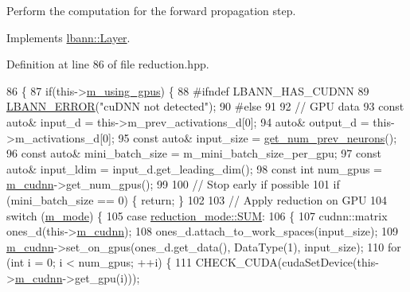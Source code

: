 Perform the computation for the forward propagation step. 

Implements \hyperlink{classlbann_1_1Layer_a523319dd1bd87a0612afa1912bb5aad7}{lbann\+::\+Layer}.



Definition at line 86 of file reduction.\+hpp.


\begin{DoxyCode}
86                              \{
87     \textcolor{keywordflow}{if}(this->\hyperlink{classlbann_1_1Layer_af7881cb5eff5207c15fa835d65462e8f}{m\_using\_gpus}) \{
88 \textcolor{preprocessor}{    #ifndef LBANN\_HAS\_CUDNN}
89       \hyperlink{base_8hpp_a80b1d707117e968a6951b7222e4b2b87}{LBANN\_ERROR}(\textcolor{stringliteral}{"cuDNN not detected"});
90 \textcolor{preprocessor}{    #else}
91       
92       \textcolor{comment}{// GPU data}
93       \textcolor{keyword}{const} \textcolor{keyword}{auto}& input\_d = this->m\_prev\_activations\_d[0];
94       \textcolor{keyword}{auto}& output\_d = this->m\_activations\_d[0];
95       \textcolor{keyword}{const} \textcolor{keyword}{auto}& input\_size = \hyperlink{classlbann_1_1Layer_a27112eb70bbfbd7f3c3e749960400dec}{get\_num\_prev\_neurons}();
96       \textcolor{keyword}{const} \textcolor{keyword}{auto}& mini\_batch\_size = m\_mini\_batch\_size\_per\_gpu;
97       \textcolor{keyword}{const} \textcolor{keyword}{auto}& input\_ldim = input\_d.get\_leading\_dim();
98       \textcolor{keyword}{const} \textcolor{keywordtype}{int} num\_gpus = \hyperlink{classlbann_1_1Layer_a08dbb94239e3b8c96329786c57c72e21}{m\_cudnn}->get\_num\_gpus();
99 
100       \textcolor{comment}{// Stop early if possible}
101       \textcolor{keywordflow}{if} (mini\_batch\_size == 0) \{ \textcolor{keywordflow}{return}; \}
102 
103       \textcolor{comment}{// Apply reduction on GPU}
104       \textcolor{keywordflow}{switch} (\hyperlink{classlbann_1_1reduction__layer_aa8c753154fec05a00ede9217df3ba638}{m\_mode}) \{
105       \textcolor{keywordflow}{case} \hyperlink{namespacelbann_a5975e1fb530a267728bfb01dc5c1be9ba6970bdc2201030b9c03fbdcf3973858a}{reduction\_mode::SUM}:
106         \{
107           cudnn::matrix ones\_d(this->\hyperlink{classlbann_1_1Layer_a08dbb94239e3b8c96329786c57c72e21}{m\_cudnn});
108           ones\_d.attach\_to\_work\_spaces(input\_size);
109           \hyperlink{classlbann_1_1Layer_a08dbb94239e3b8c96329786c57c72e21}{m\_cudnn}->set\_on\_gpus(ones\_d.get\_data(), DataType(1), input\_size);
110           \textcolor{keywordflow}{for} (\textcolor{keywordtype}{int} i = 0; i < num\_gpus; ++i) \{
111             CHECK\_CUDA(cudaSetDevice(this->\hyperlink{classlbann_1_1Layer_a08dbb94239e3b8c96329786c57c72e21}{m\_cudnn}->get\_gpu(i)));

\end{DoxyCode}
